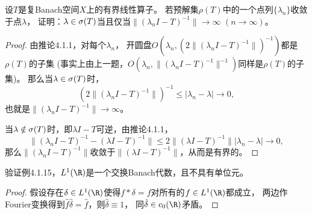 \begin{10}
    设$T$是复Banach空间$X$上的有界线性算子。
    若预解集$\rho(T)$中的一个点列$\{\lambda_n\}$收敛于点$\lambda$，
    证明：$\lambda\in\sigma(T)$当且仅当$\|(\lambda_n I-T)^{-1}\|\to\infty$ $(n\to\infty)$。
\end{10}
\begin{proof}
    由推论4.1.1，对每个$\lambda_n$，
    开圆盘$O(\lambda_n,(2\|(\lambda_nI-T)^{-1}\|)^{-1})$都是$\rho(T)$的子集
    (事实上由上一题，$O(\lambda_n,\|(\lambda_nI-T)^{-1}\|^{-1})$同样是$\rho(T)$的子集)。
    那么当$\lambda\in\sigma(T)$时，\[(2\|(\lambda_nI-T)^{-1}\|)^{-1}
    \leqslant|\lambda_n-\lambda|\to0,\]也就是$\|(\lambda_nI-T)^{-1}\|\to\infty$。

    当$\lambda\notin\sigma(T)$时，即$\lambda I-T$可逆，由推论4.1.1，
    \[\|(\lambda_nI-T)^{-1}-(\lambda I-T)^{-1}\|
    \leqslant2\|(\lambda I-T)^{-1}\||\lambda_n-\lambda|\to0,\]
    那么$\|(\lambda_nI-T)^{-1}\|$收敛于$\|(\lambda I-T)^{-1}\|$，从而是有界的。
\end{proof}

\begin{13}
    验证例4.1.15，$L^1(\R)$是一个交换Banach代数，且不具有单位元。
\end{13}
\begin{proof}
    假设存在$\delta\in L^1(\R)$使得$f*\delta=f$对所有的$f\in L^1(\R)$都成立，
    两边作Fourier变换得到$\hat{f}\hat{\delta}=\hat{f}$，则$\hat{\delta}\equiv1$，
    同$\hat{\delta}\in c_0(\R)$矛盾。
\end{proof}


